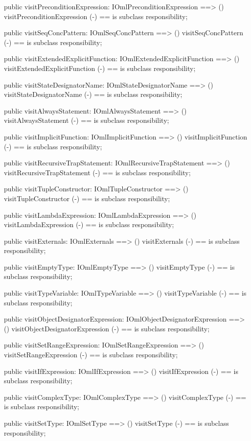 \begin{vdm_al}
  public visitPreconditionExpression: IOmlPreconditionExpression ==> ()
  visitPreconditionExpression (-) == is subclass responsibility;

  public visitSeqConcPattern: IOmlSeqConcPattern ==> ()
  visitSeqConcPattern (-) == is subclass responsibility;

  public visitExtendedExplicitFunction: IOmlExtendedExplicitFunction ==> ()
  visitExtendedExplicitFunction (-) == is subclass responsibility;

  public visitStateDesignatorName: IOmlStateDesignatorName ==> ()
  visitStateDesignatorName (-) == is subclass responsibility;

  public visitAlwaysStatement: IOmlAlwaysStatement ==> ()
  visitAlwaysStatement (-) == is subclass responsibility;

  public visitImplicitFunction: IOmlImplicitFunction ==> ()
  visitImplicitFunction (-) == is subclass responsibility;

  public visitRecursiveTrapStatement: IOmlRecursiveTrapStatement ==> ()
  visitRecursiveTrapStatement (-) == is subclass responsibility;

  public visitTupleConstructor: IOmlTupleConstructor ==> ()
  visitTupleConstructor (-) == is subclass responsibility;

  public visitLambdaExpression: IOmlLambdaExpression ==> ()
  visitLambdaExpression (-) == is subclass responsibility;

  public visitExternals: IOmlExternals ==> ()
  visitExternals (-) == is subclass responsibility;

  public visitEmptyType: IOmlEmptyType ==> ()
  visitEmptyType (-) == is subclass responsibility;

  public visitTypeVariable: IOmlTypeVariable ==> ()
  visitTypeVariable (-) == is subclass responsibility;

  public visitObjectDesignatorExpression: IOmlObjectDesignatorExpression ==> ()
  visitObjectDesignatorExpression (-) == is subclass responsibility;

  public visitSetRangeExpression: IOmlSetRangeExpression ==> ()
  visitSetRangeExpression (-) == is subclass responsibility;

  public visitIfExpression: IOmlIfExpression ==> ()
  visitIfExpression (-) == is subclass responsibility;

  public visitComplexType: IOmlComplexType ==> ()
  visitComplexType (-) == is subclass responsibility;

  public visitSetType: IOmlSetType ==> ()
  visitSetType (-) == is subclass responsibility;


\end{vdm_al}
